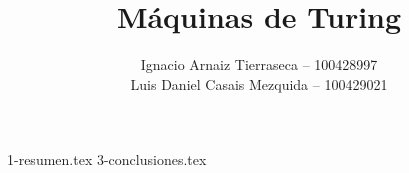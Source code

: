 \documentclass[es]{uc3mreport}
\author{
  Ignacio Arnaiz Tierraseca -- 100428997\\
  Luis Daniel Casais Mezquida -- 100429021
}
\title{Máquinas de Turing}
\begin{document}
  \makecover[old]

  \tableofcontents
  \listoffigures
  \listoftables

  \begin{report}
    {1-resumen.tex}
    {3-conclusiones.tex}
  \end{report}

  \makebibliography

\end{document}

